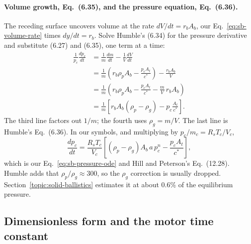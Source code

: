 \paragraph{Volume growth, Eq.~(6.35), and the pressure equation,
Eq.~(6.36).} The receding surface uncovers volume at the rate
$dV/dt=r_bA_b$, our Eq.~\eqref{eq:sb-volume-rate} times $dy/dt=r_b$.
Solve Humble's (6.34) for the pressure derivative and substitute
(6.27) and (6.35), one term at a time:
\begin{align*}
 \frac1{p_c}\frac{dp_c}{dt}
 &=\frac1m\frac{dm}{dt}-\frac1V\frac{dV}{dt}\\
 &=\frac1m\left(r_b\rho_pA_b-\frac{p_cA_t}{c^*}\right)
   -\frac{r_bA_b}{V}\\
 &=\frac1m\left(r_b\rho_pA_b-\frac{p_cA_t}{c^*}
   -\frac mV\,r_bA_b\right)\\
 &=\frac1m\left[r_bA_b(\rho_p-\rho_g)-p_c\frac{A_t}{c^*}\right].
\end{align*}
The third line factors out $1/m$; the fourth uses $\rho_g=m/V$.
The last line is Humble's Eq.~(6.36). In our symbols, and multiplying
by $p_c/m_c=R_sT_c/V_c$,
\begin{equation}\label{eq:ld-pressure}
 \frac{dp_c}{dt}
 =\frac{R_sT_c}{V_c}
  \left[(\rho_p-\rho_g)A_b\,a\,p_c^n-\frac{p_cA_t}{c^*}\right],
\end{equation}
which is our Eq.~\eqref{eq:sb-pressure-ode} and Hill and Peterson's
Eq.~(12.28). Humble adds that $\rho_p/\rho_g\approx300$, so the
$\rho_g$ correction is usually dropped. Section~\ref{topic:solid-ballistics}
estimates it at about 0.6\% of the equilibrium pressure.

\subsection{Dimensionless form and the motor time constant}
\label{sec:ld-dimensionless}
